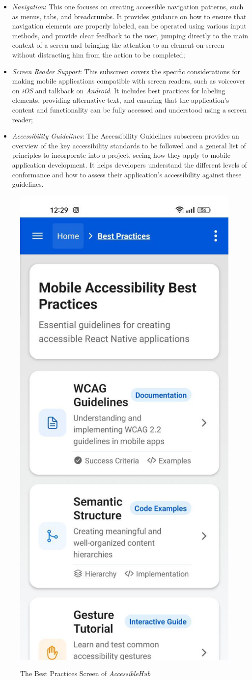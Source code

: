 \begin{enumerate}
\begin{itemize}
        \item \textit{Navigation}: This one focuses on creating accessible navigation patterns, such as menus, tabs, and breadcrumbs. It provides guidance on how to ensure that navigation elements are properly labeled, can be operated using various input methods, and provide clear feedback to the user, jumping directly to the main context of a screen and bringing the attention to an element on-screen without distracting him from the action to be completed;

        \item \textit{Screen Reader Support}: This subscreen covers the specific considerations for making mobile applications compatible with screen readers, such as \gls{voiceover} on \textit{iOS} and \gls{talkback} on \textit{Android}. It includes best practices for labeling elements, providing alternative text, and ensuring that the application's content and functionality can be fully accessed and understood using a screen reader;

        \item \textit{Accessibility Guidelines}: The Accessibility Guidelines subscreen provides an overview of the key accessibility standards to be followed and a general list of principles to incorporate into a project, seeing how they apply to mobile application development. It helps developers understand the different levels of conformance and how to assess their application's accessibility against these guidelines.
    \end{itemize}

\begin{figure}[ht]
\centering
\includegraphics[width=0.4\linewidth, alt={Screenshot of the Best Practices Screen of AccessibleHub}]{img/best-practices.jpg}
\caption{The Best Practices Screen of \textit{AccessibleHub}}\label{fig:best-practices}
\end{figure}


\end{enumerate}
